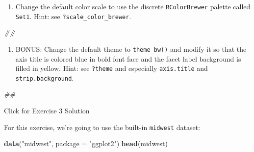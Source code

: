 \documentclass[
]{book}
\newenvironment{Shaded}{\begin{snugshade}}{\end{snugshade}}
\newcommand{\CommentTok}[1]{\textcolor[rgb]{0.56,0.35,0.01}{\textit{#1}}}
\newcommand{\DataTypeTok}[1]{\textcolor[rgb]{0.13,0.29,0.53}{#1}}
\newcommand{\KeywordTok}[1]{\textcolor[rgb]{0.13,0.29,0.53}{\textbf{#1}}}
\newcommand{\NormalTok}[1]{#1}
\newcommand{\StringTok}[1]{\textcolor[rgb]{0.31,0.60,0.02}{#1}}
\providecommand{\tightlist}{%
  \setlength{\itemsep}{0pt}\setlength{\parskip}{0pt}}
\begin{document}
\begin{enumerate}
\def\labelenumi{\arabic{enumi}.}
\setcounter{enumi}{4}
\tightlist
\item
  Change the default color scale to use the discrete \texttt{RColorBrewer} palette called \texttt{Set1}. Hint: see \texttt{?scale\_color\_brewer}.
\end{enumerate}

\begin{Shaded}
\begin{Highlighting}[]
\CommentTok{\#\# }
\end{Highlighting}
\end{Shaded}

\begin{enumerate}
\def\labelenumi{\arabic{enumi}.}
\setcounter{enumi}{5}
\tightlist
\item
  BONUS: Change the default theme to \texttt{theme\_bw()} and modify it so that the axis title is colored blue in bold font face and the facet label background is filled in yellow. Hint: see \texttt{?theme} and especially \texttt{axis.title} and \texttt{strip.background}.
\end{enumerate}

\begin{Shaded}
\begin{Highlighting}[]
\CommentTok{\#\# }
\end{Highlighting}
\end{Shaded}

{Click for Exercise 3 Solution}

For this exercise, we're going to use the built-in \texttt{midwest} dataset:

\begin{Shaded}
\begin{Highlighting}[]
\KeywordTok{data}\NormalTok{(}\StringTok{"midwest"}\NormalTok{, }\DataTypeTok{package =} \StringTok{"ggplot2"}\NormalTok{)}
\KeywordTok{head}\NormalTok{(midwest)}
\end{Highlighting}
\end{Shaded}
\end{document}
